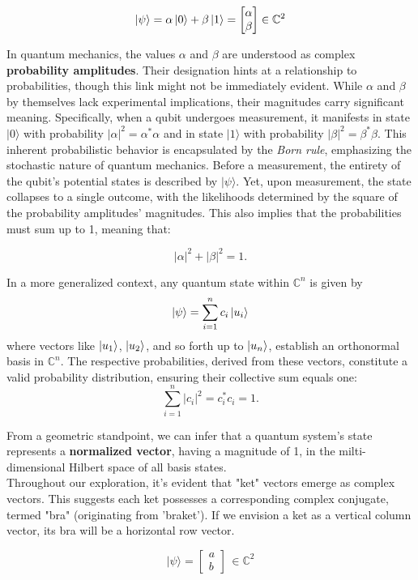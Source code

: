 \documentclass[12pt,a4paper]{report}
\newcommand{\abs}[1]{\left| #1 \right|}
\begin{document}
\[
\ket{\psi} = \alpha \ket{0} + \beta \ket{1} = \begin{bmatrix} \alpha \\ \beta \end{bmatrix} \in \mathbb{C}^2
\]

\noindent
In quantum mechanics, the values \(\alpha\) and \(\beta\) are understood as complex \textbf{probability amplitudes}. Their designation hints at a relationship to probabilities, though this link might not be immediately evident. While \(\alpha\) and \(\beta\) by themselves lack experimental implications, their magnitudes carry significant meaning. Specifically, when a qubit undergoes measurement, it manifests in state \(|0\rangle\) with probability \(|\alpha|^2 = \alpha^*\alpha\) and in state \(|1\rangle\) with probability \(|\beta|^2= \beta^*\beta\). This inherent probabilistic behavior is encapsulated by the \emph{Born rule}, emphasizing the stochastic nature of quantum mechanics. Before a measurement, the entirety of the qubit's potential states is described by \(|\psi\rangle\). Yet, upon measurement, the state collapses to a single outcome, with the likelihoods determined by the square of the probability amplitudes' magnitudes. This also implies that the probabilities must sum up to 1, meaning that:

\[
\abs{\alpha}^2 + \abs{\beta}^2 = 1. 
\]

\noindent
In a more generalized context, any quantum state within \(\mathbb{C}^n\) is given by
\[
    \ket{\psi} = \sum_{i=1}^n c_i \ket{u_i}
\]
where vectors like \(\ket{u_1}\), \(\ket{u_2}\), and so forth up to \(\ket{u_n}\), establish an orthonormal basis in \(\mathbb{C}^n\). The respective probabilities, derived from these vectors, constitute a valid probability distribution, ensuring their collective sum equals one:
\[
\sum_{i=1}^n |c_i|^2 = c_i^* c_i = 1.
\]

\noindent
From a geometric standpoint, we can infer that a quantum system's state represents a \textbf{normalized vector}, having a magnitude of 1, in the milti-dimensional Hilbert space of all basis states.
\\

\noindent
Throughout our exploration, it's evident that "ket" vectors emerge as complex vectors. This suggests each ket possesses a corresponding complex conjugate, termed "bra" (originating from 'braket'). If we envision a ket as a vertical column vector, its bra will be a horizontal row vector.

\[
|\psi\rangle = 
\begin{bmatrix}
a \\
b 
\end{bmatrix}
\, \in \mathbb{C}^2
\]
\end{document}
